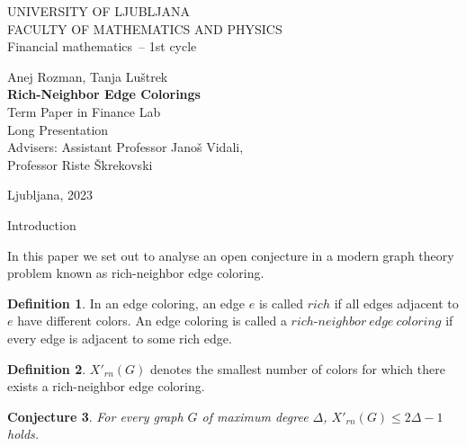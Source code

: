 \documentclass[12pt,a4paper]{amsart}
\makeatletter
\renewcommand\section{\@startsection{section}{1}
  \z@{.5\linespacing\@plus.7\linespacing}{.5\linespacing}
  {\normalfont\scshape\large\centering}}
\theoremstyle{definition} %
\newtheorem{definicija}{Definition}[section]
\theoremstyle{plain} %
\newtheorem{conjecture}[definicija]{Conjecture}
\newcommand{\program}{Financial mathematics} %
\newcommand{\imeavtorja}{Anej Rozman, Tanja Luštrek} %
\newcommand{\imementorja}{Assistant Professor Janoš Vidali} %
\newcommand{\imesomentorja}{Professor Riste Škrekovski}
\newcommand{\naslovdela}{Rich-Neighbor Edge Colorings}
\newcommand{\letnica}{2023} %
\makeatother
\begin{document}
\thispagestyle{empty}
{\large
\noindent UNIVERSITY OF LJUBLJANA\\[1mm]
FACULTY OF MATHEMATICS AND PHYSICS\\[5mm]
\program\ -- 1st cycle}
\vfill

\begin{center}{\large
\imeavtorja\\[2mm]
{\bf \naslovdela}\\[10mm]
Term Paper in Finance Lab\\[2mm]
Long Presentation\\[1cm]
Advisers: \imementorja, \\ \imesomentorja\\[2mm]}
\end{center}
\vfill

{\large
Ljubljana, \letnica}
\pagebreak

\thispagestyle{empty}
\tableofcontents
\pagebreak

\section{Introduction}

    In this paper we set out to analyse an open conjecture in a modern graph theory problem known as rich-neighbor edge coloring.

    \begin{definicija}
        In an edge coloring, an edge $e$ is called $rich$ if all edges adjacent to $e$ have different colors. An edge coloring is 
        called a $rich\text{-}neighbor \ edge \ coloring$ if every edge is adjacent to some rich edge.
    \end{definicija}

    \begin{definicija}
        $X'_{rn}(G)$ denotes the smallest number of colors for which there exists a rich-neighbor edge coloring.
    \end{definicija}

    \begin{conjecture}
        For every graph $G$ of maximum degree $\Delta$, $X'_{rn}(G) \leq 2\Delta - 1$ holds.
    \end{conjecture}
\end{document}
